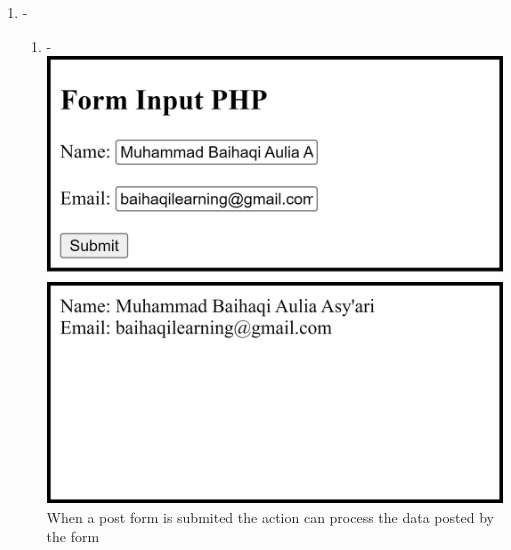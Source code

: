 \documentclass[12pt,titlepage]{article}
\begin{document}
\begin{enumerate}
    \item -
    \begin{enumerate}
        \item - \\ \includegraphics[width=.85\textwidth]{images/figures/fig3.1_a.png} \\ \includegraphics[width=.85\textwidth]{images/figures/fig3.1_b.png} \\ When a post form is submited the action can process the data posted by the form
        
        \newpage
        

\end{enumerate}
\end{enumerate}
\end{document}

